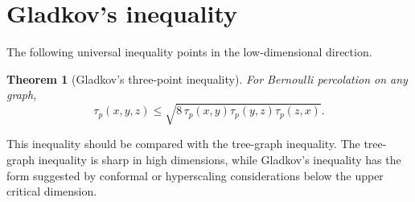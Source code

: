 \documentclass[11pt,reqno]{book}
\numberwithin{equation}{chapter}
\theoremstyle{plain}
\newtheorem{theorem}{Theorem}[chapter]
\theoremstyle{definition}
\theoremstyle{remark}
\newcommand{\1}{\mathbf 1}
\begin{document}
\section{Gladkov's inequality}

The following universal inequality points in the low-dimensional direction.

\begin{theorem}[Gladkov's three-point inequality]
For Bernoulli percolation on any graph,
\[
  \tau_p(x,y,z)
  \leq
  \sqrt{
    8\,\tau_p(x,y)\tau_p(y,z)\tau_p(z,x)
  }.
\]
\end{theorem}

This inequality should be compared with the tree-graph inequality. The tree-graph inequality is sharp in high dimensions, while Gladkov's inequality has the form suggested by conformal or hyperscaling considerations below the upper critical dimension.
\end{document}
